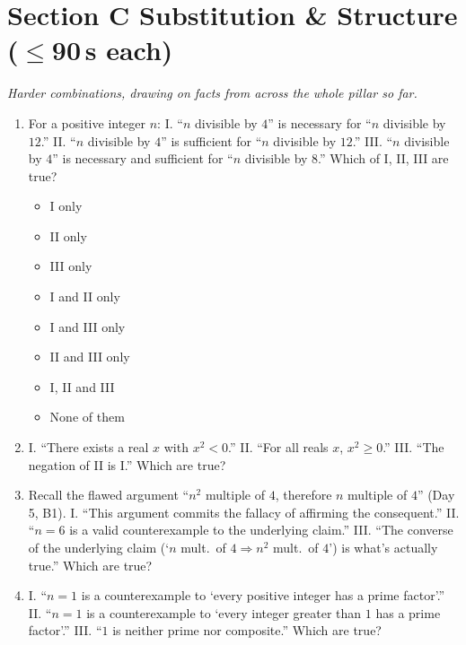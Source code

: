 \documentclass[11pt,a4paper]{article}
\begin{document}
\section*{Section C \quad Substitution \& Structure \hfill{\normalfont\small($\leq$90\,s each)}}

\noindent\textit{Harder combinations, drawing on facts from across the whole pillar so far.}

\begin{enumerate}

\item For a positive integer $n$: I. ``$n$ divisible by $4$'' is necessary for ``$n$ divisible by $12$.'' II. ``$n$ divisible by $4$'' is sufficient for ``$n$ divisible by $12$.'' III. ``$n$ divisible by $4$'' is necessary and sufficient for ``$n$ divisible by $8$.'' Which of I, II, III are true?
\begin{itemize}
\item[A)] I only
\item[B)] II only
\item[C)] III only
\item[D)] I and II only
\item[E)] I and III only
\item[F)] II and III only
\item[G)] I, II and III
\item[H)] None of them
\end{itemize}

\item I. ``There exists a real $x$ with $x^2<0$.'' II. ``For all reals $x$, $x^2\geq0$.'' III. ``The negation of II is I.'' Which are true?

\item Recall the flawed argument ``$n^2$ multiple of $4$, therefore $n$ multiple of $4$'' (Day 5, B1). I. ``This argument commits the fallacy of affirming the consequent.'' II. ``$n=6$ is a valid counterexample to the underlying claim.'' III. ``The converse of the underlying claim (`$n$ mult.\ of $4 \Rightarrow n^2$ mult.\ of $4$') is what's actually true.'' Which are true?

\item I. ``$n=1$ is a counterexample to `every positive integer has a prime factor'.'' II. ``$n=1$ is a counterexample to `every integer greater than $1$ has a prime factor'.'' III. ``$1$ is neither prime nor composite.'' Which are true?


\end{enumerate}
\end{document}
